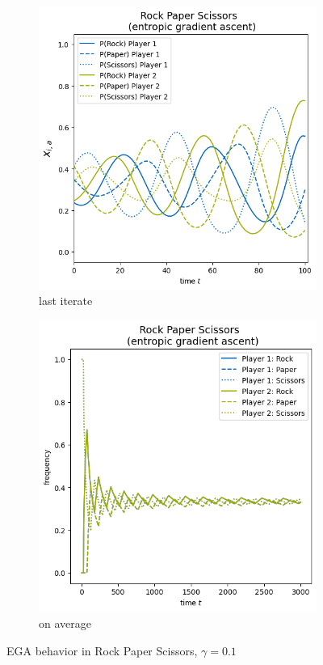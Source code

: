\begin{figure}[H]
\centering
\begin{subfigure}{.5\textwidth}
    \centering
    \includegraphics[width=\textwidth]{logos/RPS2.png}
    \caption{last iterate}
    \label{fig:RPSa}
\end{subfigure}%
\begin{subfigure}{.5\textwidth}
    \centering
    \includegraphics[width=\textwidth]{logos/RPS3.png}
    \caption{on average}
    \label{fig:RPSb}
\end{subfigure}
\caption{EGA behavior in Rock Paper Scissors, $\gamma = 0.1$}
\label{fig:RPS}
\end{figure}


